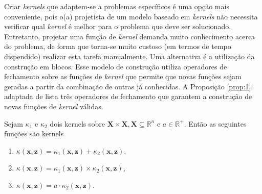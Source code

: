 
Criar \textit{kernels} que adaptem-se a problemas específicos é uma opção mais conveniente, pois o(a) projetista de um modelo baseado em \textit{kernels} não necessita verificar qual \textit{kernel} é melhor para o problema que deve ser solucionado. Entretanto, projetar uma função de \textit{kernel} demanda muito conhecimento acerca do problema, de forma que torna-se muito custoso (em termos de tempo dispendido) realizar esta tarefa manualmente. Uma alternativa é a utilização da construção em blocos. Esse modelo de construção utiliza operadores de fechamento sobre as funções de \textit{kernel} que permite que novas funções sejam geradas a partir da combinação de outras já conhecidas. A Proposição \ref{prop:1}, adaptada de \cite{shawe2004} lista três operadores de fechamento que garantem a construção de novas funções de \textit{kernel} válidas.

\begin{proposition}
    \label{prop:1}
    Sejam $\kappa_1$ e $\kappa_2$ dois kernels sobre $\mathbf{X} \times \mathbf{X}, \mathbf{X} \subseteq
    \mathbb{R}^n$ e $a \in \mathbb{R}^+$. Então as seguintes funções são kernels

    \begin{enumerate}[label=(\roman*)]
        \item $\kappa(\mathbf{x},\mathbf{z}) = \kappa_1(\mathbf{x},\mathbf{z}) + \kappa_2(\mathbf{x},\mathbf{z})$,
        \item $\kappa(\mathbf{x},\mathbf{z}) = \kappa_1(\mathbf{x},\mathbf{z}) \times \kappa_2(\mathbf{x},\mathbf{z})$,
        \item $\kappa(\mathbf{x},\mathbf{z}) = a \cdot \kappa_2(\mathbf{x},\mathbf{z})$.
    \end{enumerate}
\end{proposition}

